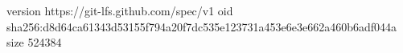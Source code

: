 version https://git-lfs.github.com/spec/v1
oid sha256:d8d64ca61343d53155f794a20f7dc535e123731a453e6e3e662a460b6adf044a
size 524384
